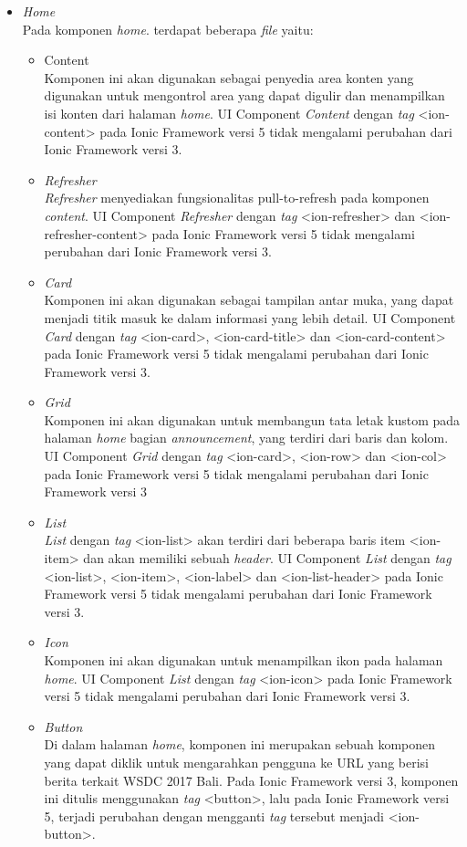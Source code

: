 \begin{itemize}
	\item \textit{Home}\\
	Pada komponen \textit{home}. terdapat beberapa \textit{file} yaitu:
		\begin{itemize}
			\item Content \\
		Komponen ini akan digunakan sebagai penyedia area konten yang digunakan untuk mengontrol area yang dapat digulir dan menampilkan isi konten dari halaman \textit{home}. UI Component \textit{Content} dengan \textit{tag} <ion-content> pada Ionic Framework versi 5 tidak mengalami perubahan dari Ionic Framework versi 3.
			\item \textit{Refresher} \\
		\textit{Refresher} menyediakan fungsionalitas  pull-to-refresh pada komponen \textit{content}. UI Component \textit{Refresher} dengan \textit{tag} <ion-refresher> dan <ion-refresher-content> pada Ionic Framework versi 5 tidak mengalami perubahan dari Ionic Framework versi 3.
			\item \textit{Card} \\
			Komponen ini akan digunakan sebagai tampilan antar muka, yang dapat menjadi titik masuk ke dalam informasi yang lebih detail. UI Component \textit{Card} dengan \textit{tag} <ion-card>, <ion-card-title> dan <ion-card-content> pada Ionic Framework versi 5 tidak mengalami perubahan dari Ionic Framework versi 3.

\newpage			
			
			\item \textit{Grid} \\
			Komponen ini akan digunakan untuk membangun tata letak kustom pada halaman \textit{home} bagian \textit{announcement}, yang terdiri dari baris dan kolom. UI Component \textit{Grid} dengan \textit{tag} <ion-card>, <ion-row> dan <ion-col> pada Ionic Framework versi 5 tidak mengalami perubahan dari Ionic Framework versi 3
			\item \textit{List} \\
			\textit{List}  dengan \textit{tag} <ion-list> akan terdiri dari beberapa baris item <ion-item> dan akan memiliki sebuah \textit{header}. UI Component \textit{List} dengan \textit{tag} <ion-list>, <ion-item>, <ion-label> dan <ion-list-header> pada Ionic Framework versi 5 tidak mengalami perubahan dari Ionic Framework versi 3.
			\item \textit{Icon} \\
			Komponen ini akan digunakan untuk menampilkan ikon pada halaman \textit{home}. UI Component \textit{List} dengan \textit{tag} <ion-icon> pada Ionic Framework versi 5 tidak mengalami perubahan dari Ionic Framework versi 3.
			\item \textit{Button} \\
			Di dalam halaman \textit{home}, komponen ini merupakan sebuah komponen yang dapat diklik untuk mengarahkan pengguna ke URL yang berisi berita terkait WSDC 2017 Bali. Pada Ionic Framework versi 3, komponen ini ditulis menggunakan \textit{tag} <button>, lalu pada Ionic Framework versi 5, terjadi perubahan dengan mengganti \textit{tag} tersebut menjadi <ion-button>.
		\end{itemize}
		

\end{itemize}
